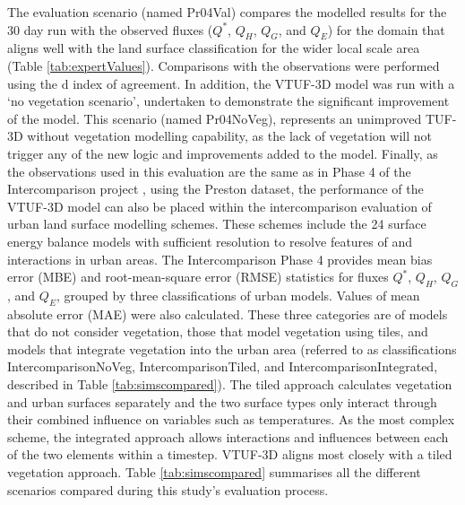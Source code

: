 \documentclass[final,3p,times,authoryear]{elsarticle}
\begin{document}
The evaluation scenario (named Pr04Val) compares the modelled results for the 30 day run with the observed fluxes ($Q^{*}$, $Q_{H}$, $Q_{G}$, and $Q_{E}$) for the domain that aligns well with the land surface classification for the wider local scale area (Table \ref{tab:expertValues}). Comparisons with the observations were performed using the \cite{Willmott1981} d index of agreement. In addition, the VTUF-3D model was run with a `no vegetation scenario', undertaken to demonstrate the significant improvement of the model. This scenario (named Pr04NoVeg), represents an unimproved TUF-3D without vegetation modelling capability, as the lack of vegetation will not trigger any of the new logic and improvements added to the model. Finally, as the observations used in this evaluation are the same as in Phase 4 of the Intercomparison project \citep{Best2012}, using the \cite{Coutts2007} Preston dataset, the performance of the VTUF-3D model can also be placed within the intercomparison evaluation of urban land surface modelling schemes. These schemes include the 24 surface energy balance models with sufficient resolution to resolve features of and interactions in urban areas. The Intercomparison Phase 4 provides mean bias error (MBE) and root-mean-square error (RMSE) statistics for fluxes $Q^{*}$, $Q_{H}$, $Q_{G}$, and $Q_{E}$, grouped by three classifications of urban models. Values of mean absolute error (MAE) were also calculated. These three categories are of models that do not consider vegetation, those that model vegetation using tiles, and models that integrate vegetation into the urban area (referred to as classifications IntercomparisonNoVeg, IntercomparisonTiled, and IntercomparisonIntegrated, described in Table \ref{tab:simscompared}). The tiled approach calculates vegetation and urban surfaces separately and the two surface types only interact through their combined influence on variables such as temperatures. As the most complex scheme, the integrated approach allows interactions and influences between each of the two elements within a timestep. VTUF-3D aligns most closely with a tiled vegetation approach. Table \ref{tab:simscompared} summarises all the different scenarios compared during this study's evaluation process.
\end{document}
